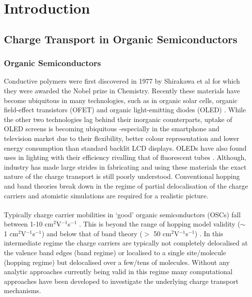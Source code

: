 \chapter{Introduction}
\label{chap:intro}

\section{Charge Transport in Organic Semiconductors}
\subsection{Organic Semiconductors}
Conductive polymers were first discovered in 1977 by Shirakawa et al  \cite{chiang_electrical_1977, Shirakawa1977Jan} for which they were awarded the Nobel prize in Chemistry. Recently these materials have become ubiquitous in many technologies, such as in organic solar cells\cite{Kippelen2009}, organic field-effect transistors (OFET) \cite{Malachowski2010Jun} and organic light-emitting diodes (OLED) \cite{ThejoKalyani2012Jun}. While the other two technologies lag behind their inorganic counterparts, uptake of OLED screens is becoming ubiquitous -especially in the smartphone and television market due to their flexibility, better colour representation and lower energy consumption than standard backlit LCD displays. OLEDs have also found uses in lighting with their efficiency rivalling that of fluorescent tubes \cite{Reineke2009May, OLED_lighting}. Although, industry has made large strides in fabricating and using these materials the exact nature of the charge transport is still poorly understood. Conventional hopping and band theories break down in the regime of partial delocalisation of the charge carriers and atomistic simulations are required for a realistic picture.
\\\\
Typically charge carrier mobilities in `good' organic semiconductors (OSCs) fall between 1-10 cm$^2$V$^{-1}$s$^{-1}$ \cite{Brown2018Mar}. This is beyond the range of hopping model validity ($\sim$ 1 cm$^2$V$^{-1}$s$^{-1}$) and below that of band theory ($>$ 50 cm$^2$V$^{-1}$s$^{-1}$) \cite{yavuz_dichotomy_2017}. In this intermediate regime the charge carriers are typically not completely delocalised at the valence band edges (band regime) or localised to a single site/molecule (hopping regime) but delocalised over a few/tens of molecules. Without any analytic approaches currently being valid in this regime many computational approaches have been developed to investigate the underlying charge transport mechanisms\cite{oberhofer_charge_2017}.
\\\\
